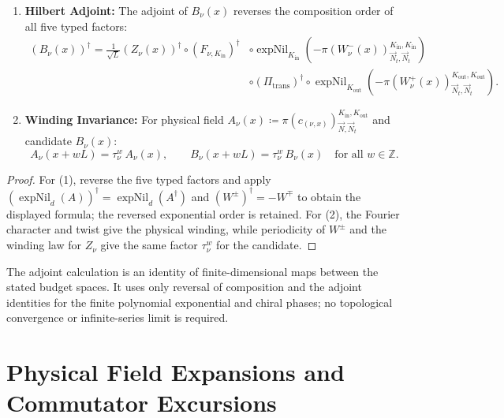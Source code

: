 \begin{lemma}
\label{lem:vertex_candidate_properties}
\begin{enumerate}
    \item \textbf{Hilbert Adjoint:} The adjoint of $B_\nu(x)$ reverses the composition order of all five typed factors:
    \begin{align}
    (B_\nu(x))^\dagger = \frac{1}{\sqrt{L}} (Z_\nu(x))^\dagger \circ (F_{\nu, K_{\mathrm{in}}})^\dagger &\circ \operatorname{expNil}_{K_{\mathrm{in}}}\!\left( -\pi(W^-_\nu(x))_{\vec{N}_t, \vec{N}_t}^{K_{\mathrm{in}}, K_{\mathrm{in}}} \right) \\
    &\circ (\Pi_{\mathrm{trans}})^\dagger \circ \operatorname{expNil}_{K_{\mathrm{out}}}\!\left( -\pi(W^+_\nu(x))_{\vec{N}_t, \vec{N}_t}^{K_{\mathrm{out}}, K_{\mathrm{out}}} \right).
    \end{align}
    \item \textbf{Winding Invariance:} For physical field $A_\nu(x) \coloneqq \pi(c_{(\nu, x)})_{\vec{N}, \vec{N}_t}^{K_{\mathrm{in}}, K_{\mathrm{out}}}$ and candidate $B_\nu(x)$:
    \begin{equation}
    A_\nu(x + w L) = \tau_\nu^w\, A_\nu(x), \qquad B_\nu(x + w L) = \tau_\nu^w\, B_\nu(x) \quad \text{for all } w \in \mathbb{Z}.
    \end{equation}
\end{enumerate}
\end{lemma}

\begin{proof}
For (1), reverse the five typed factors and apply $(\operatorname{expNil}_d(A))^\dagger=\operatorname{expNil}_d(A^\dagger)$ and $(W^\pm)^\dagger=-W^\mp$ to obtain the displayed formula; the reversed exponential order is retained. For (2), the Fourier character and twist give the physical winding, while periodicity of $W^\pm$ and the winding law for $Z_\nu$ give the same factor $\tau_\nu^w$ for the candidate.
\end{proof}

\begin{remark}
The adjoint calculation is an identity of finite-dimensional maps between the stated budget spaces. It uses only reversal of composition and the adjoint identities for the finite polynomial exponential and chiral phases; no topological convergence or infinite-series limit is required.
\end{remark}

\section{Physical Field Expansions and Commutator Excursions}

